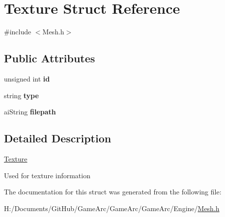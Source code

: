 \hypertarget{struct_texture}{\section{Texture Struct Reference}
\label{struct_texture}
}


{\ttfamily \#include $<$Mesh.\+h$>$}

\subsection*{Public Attributes}
\begin{DoxyCompactItemize}
\item 
\hypertarget{struct_texture_aed42161a5c00b6020c85833401da6da6}{unsigned int {\bfseries id}}\label{struct_texture_aed42161a5c00b6020c85833401da6da6}

\item 
\hypertarget{struct_texture_adacb495ed5140ec76a09cd130e7d5c32}{string {\bfseries type}}\label{struct_texture_adacb495ed5140ec76a09cd130e7d5c32}

\item 
\hypertarget{struct_texture_a69c8def64c608063b2ecb7fd785121ee}{ai\+String {\bfseries filepath}}\label{struct_texture_a69c8def64c608063b2ecb7fd785121ee}

\end{DoxyCompactItemize}


\subsection{Detailed Description}
\hyperlink{struct_texture}{Texture}

Used for texture information 

The documentation for this struct was generated from the following file\+:\begin{DoxyCompactItemize}
\item 
H\+:/\+Documents/\+Git\+Hub/\+Game\+Arc/\+Game\+Arc/\+Game\+Arc/\+Engine/\hyperlink{_mesh_8h}{Mesh.\+h}\end{DoxyCompactItemize}
